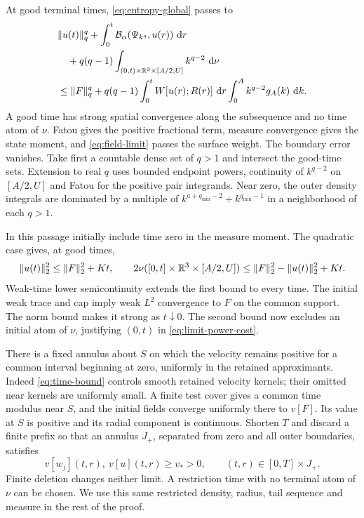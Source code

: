 At good terminal times, \eqref{eq:entropy-global} passes to
\begin{align}
 &\|u(t)\|_q^q+\int_0^t\mathcal B_\alpha(\Psi_{k^q},u(r))\,\,\mathrm d r\nonumber\\
 &\quad+q(q-1)\int_{(0,t)\times\mathbb R^3\times[A/2,U]}k^{q-2}\,\,\mathrm d\nu\nonumber\\
 &\leq\|F\|_q^q+q(q-1)\int_0^tW[u(r);R(r)]\,\,\mathrm d r
             \int_0^A k^{q-2}g_A(k)\,\,\mathrm d k.\label{eq:limit-power-cost}
\end{align}
A good time has strong spatial convergence along the subsequence and no
time atom of $\nu$. Fatou gives the positive fractional term, measure
convergence gives the state moment, and \eqref{eq:field-limit} passes the
surface weight. The boundary error vanishes. Take first a countable dense
set of $q>1$ and intersect the good-time sets. Extension to real $q$ uses
bounded endpoint powers, continuity of $k^{q-2}$ on $[A/2,U]$ and Fatou
for the positive pair integrands. Near zero, the outer density integrals
are dominated by a multiple of
$k^{a+q_{\min}-2}+k^{q_{\min}-1}$ in a neighborhood of each $q>1$.

In this passage initially include time zero in the measure moment. The
quadratic case gives, at good times,
\[
 \|u(t)\|_2^2\leq\|F\|_2^2+Kt,\qquad
 2\nu([0,t]\times\mathbb R^3\times[A/2,U])
 \leq\|F\|_2^2-\|u(t)\|_2^2+Kt.
\]
Weak-time lower semicontinuity extends the first bound to every time.
The initial weak trace and cap imply weak $L^2$ convergence to $F$ on
the common support. The norm bound makes it strong as $t\downarrow0$.
The second bound now excludes an initial atom of $\nu$, justifying
$(0,t)$ in \eqref{eq:limit-power-cost}.

There is a fixed annulus about $S$ on which the velocity remains positive
for a common interval beginning at zero, uniformly in the retained
approximants. Indeed \eqref{eq:time-bound} controls smooth retained
velocity kernels; their omitted near kernels are uniformly small. A finite
test cover gives a common time modulus near $S$, and the initial fields
converge uniformly there to $v[F]$. Its value at $S$ is positive and its
radial component is continuous. Shorten $T$ and discard a finite prefix
so that an annulus $J_+$, separated from zero and all outer boundaries,
satisfies
\begin{equation}\label{eq:positive-annulus}
 v[w_j](t,r),\ v[u](t,r)\geq v_*>0,
 \qquad (t,r)\in[0,T]\times J_+.
\end{equation}
Finite deletion changes neither limit. A restriction time with no terminal
atom of $\nu$ can be chosen. We use this same restricted density, radius,
tail sequence and measure in the rest of the proof.
